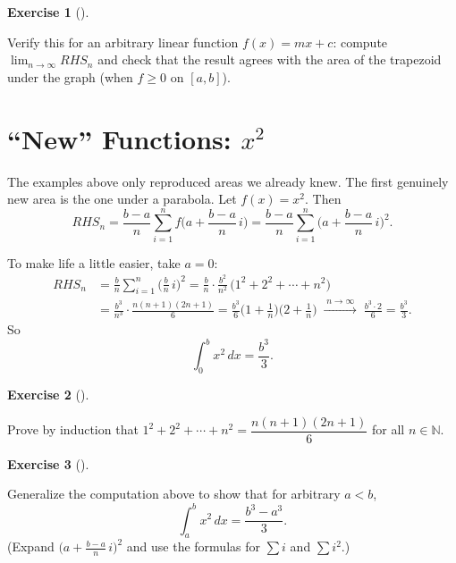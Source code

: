 \documentclass[
  letterpaper,
  DIV=11,
  numbers=noendperiod]{scrreprt}
\theoremstyle{plain}
\theoremstyle{plain}
\theoremstyle{definition}
\theoremstyle{definition}
\newtheorem{exercise}{Exercise}[chapter]
\theoremstyle{definition}
\theoremstyle{plain}
\theoremstyle{plain}
\theoremstyle{remark}
\begin{document}
\begin{exercise}[]\protect\hypertarget{exr-integral-linear}{}\label{exr-integral-linear}

Verify this for an arbitrary linear function \(f(x) = mx + c\): compute
\(\lim_{n\to\infty}RHS_n\) and check that the result agrees with the
area of the trapezoid under the graph (when \(f\ge0\) on \([a,b]\)).

\end{exercise}

\section{\texorpdfstring{``New'' Functions:
\(x^2\)}{``New'' Functions: x\^{}2}}\label{new-functions-x2}

The examples above only reproduced areas we already knew. The first
genuinely new area is the one under a parabola. Let \(f(x) = x^2\). Then
\[
RHS_n = \frac{b-a}{n}\sum_{i=1}^n f\Big(a+\frac{b-a}{n}\,i\Big)
= \frac{b-a}{n}\sum_{i=1}^n\Big(a+\frac{b-a}{n}\,i\Big)^2.
\]

To make life a little easier, take \(a=0\): \[
\begin{aligned}
RHS_n &= \frac{b}{n}\sum_{i=1}^n\Big(\frac{b}{n}\,i\Big)^2
= \frac{b}{n}\cdot\frac{b^2}{n^2}\,\big(1^2+2^2+\cdots+n^2\big) \\
&= \frac{b^3}{n^3}\cdot\frac{n(n+1)(2n+1)}{6}
= \frac{b^3}{6}\Big(1+\frac1n\Big)\Big(2+\frac1n\Big)
\;\xrightarrow{\;n\to\infty\;}\; \frac{b^3\cdot 2}{6} = \frac{b^3}{3}.
\end{aligned}
\] So \[
\int_0^b x^2\,dx = \frac{b^3}{3}.
\]

\begin{exercise}[]\protect\hypertarget{exr-sum-of-squares}{}\label{exr-sum-of-squares}

Prove by induction that \(1^2+2^2+\cdots+n^2 = \dfrac{n(n+1)(2n+1)}{6}\)
for all \(n\in\mathbb{N}\).

\end{exercise}

\begin{exercise}[]\protect\hypertarget{exr-integral-x-squared-general}{}\label{exr-integral-x-squared-general}

Generalize the computation above to show that for arbitrary \(a<b\), \[
\int_a^b x^2\,dx = \frac{b^3-a^3}{3}.
\] (Expand \(\big(a+\frac{b-a}{n}\,i\big)^2\) and use the formulas for
\(\sum i\) and \(\sum i^2\).)

\end{exercise}
\end{document}
